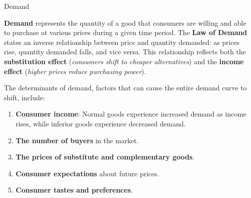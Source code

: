 \documentclass[10pt]{article}
\begin{document}
  \begin{core}{Demand}

    \textbf{Demand} represents the quantity of a good that consumers are willing and able to purchase at various prices during a given time period. The \textbf{Law of Demand} states an inverse relationship between price and quantity demanded: as prices rise, quantity demanded falls, and vice versa. This relationship reflects both the \textbf{substitution effect} (\textit{consumers shift to cheaper alternatives}) and the \textbf{income effect} (\textit{higher prices reduce purchasing power}).


    The determinants of demand, factors that can cause the entire demand curve to shift, include:

    \begin{enumerate}

      \item \textbf{Consumer income}: Normal goods experience increased demand as income rises, while inferior goods experience decreased demand.

      \item \textbf{The number of buyers} in the market.

      \item \textbf{The prices of substitute and complementary goods}.

      \item \textbf{Consumer expectations} about future prices.

      \item \textbf{Consumer tastes and preferences}.

    \end{enumerate}

  \end{core}
\end{document}
